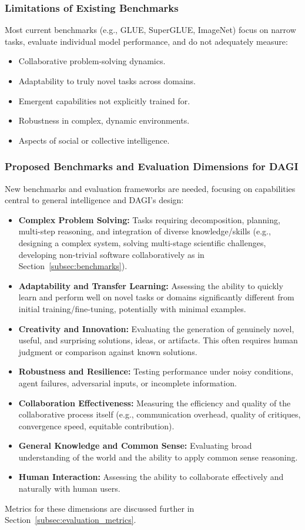 \documentclass[12pt]{amsart}
\begin{document}
\subsubsection{Limitations of Existing Benchmarks}
Most current benchmarks (e.g., GLUE, SuperGLUE, ImageNet) focus on narrow tasks, evaluate individual model performance, and do not adequately measure:
\begin{itemize}[leftmargin=*]
    \item Collaborative problem-solving dynamics.
    \item Adaptability to truly novel tasks across domains.
    \item Emergent capabilities not explicitly trained for.
    \item Robustness in complex, dynamic environments.
    \item Aspects of social or collective intelligence.
\end{itemize}

\subsubsection{Proposed Benchmarks and Evaluation Dimensions for DAGI}
New benchmarks and evaluation frameworks are needed, focusing on capabilities central to general intelligence and DAGI's design:
\begin{itemize}[leftmargin=*]
    \item \textbf{Complex Problem Solving:} Tasks requiring decomposition, planning, multi-step reasoning, and integration of diverse knowledge/skills (e.g., designing a complex system, solving multi-stage scientific challenges, developing non-trivial software collaboratively as in Section~\ref{subsec:benchmarks}).
    \item \textbf{Adaptability and Transfer Learning:} Assessing the ability to quickly learn and perform well on novel tasks or domains significantly different from initial training/fine-tuning, potentially with minimal examples.
    \item \textbf{Creativity and Innovation:} Evaluating the generation of genuinely novel, useful, and surprising solutions, ideas, or artifacts. This often requires human judgment or comparison against known solutions.
    \item \textbf{Robustness and Resilience:} Testing performance under noisy conditions, agent failures, adversarial inputs, or incomplete information.
    \item \textbf{Collaboration Effectiveness:} Measuring the efficiency and quality of the collaborative process itself (e.g., communication overhead, quality of critiques, convergence speed, equitable contribution).
    \item \textbf{General Knowledge and Common Sense:} Evaluating broad understanding of the world and the ability to apply common sense reasoning.
    \item \textbf{Human Interaction:} Assessing the ability to collaborate effectively and naturally with human users.
\end{itemize}
Metrics for these dimensions are discussed further in Section~\ref{subsec:evaluation_metrics}.
\end{document}
